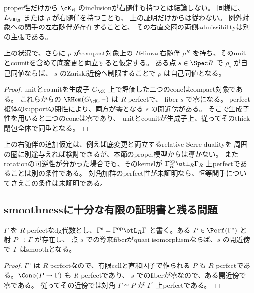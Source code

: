\begin{remark}[両側admissibilityは追加条件]
 proper性だけから \(\cK_R\) のinclusionが右随伴も持つとは結論しない。
 同様に、\(L_{\OO_B}\) または \(\rho\) が右随伴を持つことも、
 上の証明だけからは従わない。
 例外対象への関手の左右随伴が存在することと、
 その右直交圏の両側admissibilityは別の主張である。
\end{remark}

\begin{lemma}[随伴が与えられた場合のrotationの開性]
\label{lem:relative-rotation-open-conditional}
 上の状況で、さらに \(\rho\) がcompact対象上の \(R\)-linear右随伴
 \(\rho^R\) を持ち、そのunitとcounitを含めて底変更と両立すると仮定する。
 ある点 \(s\in\Spec R\) で \(\rho_s\) が自己同値ならば、
 \(s\) のZariski近傍へ制限することで \(\rho\) は自己同値となる。
\end{lemma}

\begin{proof}
 unitとcounitを生成子 \(G_{\cK}\) 上で評価した二つのconeはcompact対象である。
 これらからの \(\RHom(G_{\cK},-)\) は \(R\)-perfectで、
 fiber \(s\) で零になる。
 perfect複体のsupportの閉性により、両方が零となる \(s\) の開近傍がある。
 そこで生成子性を用いると二つのconeは零であり、
 unitとcounitが生成子上、従ってそのthick閉包全体で同型となる。
\end{proof}

上の右随伴の追加仮定は、例えば底変更と両立するrelative Serre dualityを
周囲の圏に別途与えれば検討できるが、本節のproper模型からは導かない。
またrotationの可逆性が分かった場合でも、そのkernelが
\(\Gamma_R^{\mathrm{op}}\otL_R\Gamma_R\) 上perfectであることは別の条件である。
対角加群のperfect性が未証明なら、恒等関手についてさえこの条件は未証明である。

\subsection{smoothnessに十分な有限の証明書と残る問題}

\begin{lemma}[対角の有限証明書]\label{lem:relative-diagonal-certificate}
 \(\Gamma\) を \(R\)-perfectなdg代数とし、\(\Gamma^e=\Gamma^{\mathrm{op}}\otL_R\Gamma\)
 と書く。ある \(P\in\Perf(\Gamma^e)\) と射 \(P\to\Gamma\) が存在し、
 点 \(s\) での導来fiberがquasi-isomorphismならば、\(s\) の開近傍で \(\Gamma\) はsmoothとなる。
\end{lemma}

\begin{proof}
 \(\Gamma^e\) は \(R\)-perfectなので、有限cellと直和因子で作られる \(P\) も
 \(R\)-perfectである。\(\Cone(P\to\Gamma)\) も \(R\)-perfectであり、
 \(s\) でのfiberが零なので、ある開近傍で零である。
 従ってその近傍では対角 \(\Gamma\simeq P\) が \(\Gamma^e\) 上perfectである。
\end{proof}

